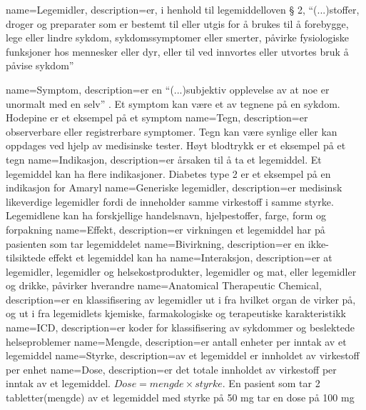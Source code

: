 {
    name=Legemidler,
    description={er, i henhold til legemiddelloven § 2, “(...)stoffer, droger og preparater som er bestemt til eller utgis for å brukes til å forebygge, lege eller lindre sykdom, sykdomssymptomer eller smerter, påvirke fysiologiske funksjoner hos mennesker eller dyr, eller til ved innvortes eller utvortes bruk å påvise sykdom”}
}

{
    name=Symptom,
    description={er en “(...)subjektiv opplevelse av at noe er unormalt med en selv” \citep{LeksikonSymptom}. Et symptom kan være et av tegnene på en sykdom. Hodepine er et eksempel på et symptom}
}
{
    name=Tegn,
    description={er observerbare eller registrerbare symptomer. Tegn kan være synlige eller kan oppdages ved hjelp av medisinske tester. Høyt blodtrykk er et eksempel på et tegn}
}
{
    name=Indikasjon,
    description={er årsaken til å ta et legemiddel. Et legemiddel kan ha flere indikasjoner. Diabetes type 2 er et eksempel på en indikasjon for Amaryl}
}
{
    name=Generiske legemidler,
    description={er medisinsk likeverdige legemidler fordi de inneholder samme virkestoff i samme styrke. Legemidlene kan ha forskjellige handelsnavn, hjelpestoffer, farge, form og forpakning}
}
{
    name=Effekt,
    description={er virkningen et legemiddel har på pasienten som tar legemiddelet}
}
{
    name=Bivirkning,
    description={er en ikke-tilsiktede effekt et legemiddel kan ha}
}
{
    name=Interaksjon,
    description={er at legemidler, legemidler og helsekostprodukter, legemidler og mat, eller legemidler og drikke, påvirker hverandre}
}
{
    name=Anatomical Therapeutic Chemical,
    description={er en klassifisering av legemidler ut i fra hvilket organ de virker på, og ut i fra legemidlets kjemiske, farmakologiske og terapeutiske karakteristikk}
}
{
    name=ICD,
    description={er koder for klassifisering av sykdommer og beslektede helseproblemer}
}
{
    name=Mengde,
    description={er antall enheter per inntak av et legemiddel}
}
{
    name=Styrke,
    description={av et legemiddel er innholdet av virkestoff per enhet}
}
{
    name=Dose,
    description={er det totale innholdet av virkestoff per inntak av et legemiddel. \(Dose = mengde \times styrke\). En pasient som tar 2 tabletter(mengde) av et legemiddel med styrke på 50 mg tar en dose på 100 mg} 
}

